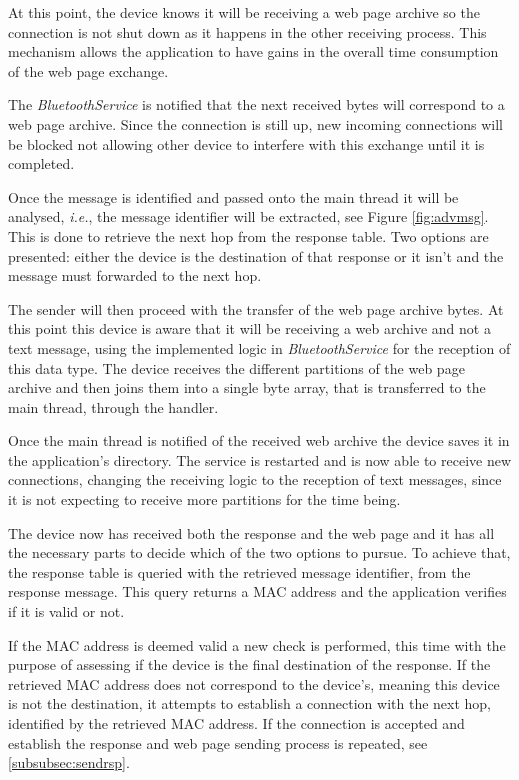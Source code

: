 At this point, the device knows it will be receiving a web page archive so the connection is not shut down as it happens in the other receiving process. This mechanism allows the application to have gains in the overall time consumption of the web page exchange.

The \textit{BluetoothService} is notified that the next received bytes will correspond to a web page archive. Since the connection is still up, new incoming connections will be blocked not allowing other device to interfere with this exchange until it is completed.

Once the message is identified and passed onto the main thread it will be analysed, \textit{i.e.}, the message identifier will be extracted, see Figure \ref{fig:advmsg}. This is done to retrieve the next hop from the response table. Two options are presented: either the device is the destination of that response or it isn't and the message must forwarded to the next hop.

The sender will then proceed with the transfer of the web page archive bytes. At this point this device is aware that it will be receiving a web archive and not a text message, using the implemented logic in \textit{BluetoothService} for the reception of this data type. The device receives the different partitions of the web page archive and then joins them into a single byte array, that is transferred to the main thread, through the handler. 

Once the main thread is notified of the received web archive the device saves it in the application's directory. The service is restarted and is now able to receive new connections, changing the receiving logic to the reception of text messages, since it is not expecting to receive more partitions for the time being.

The device now has received both the response and the web page and it has all the necessary parts to decide which of the two options to pursue. To achieve that, the response table is queried with the retrieved message identifier, from the response message. This query returns a \gls{MAC} address and the application verifies if it is valid or not.

If the \gls{MAC} address is deemed valid a new check is performed, this time with the purpose of assessing if the device is the final destination of the response. If the retrieved \gls{MAC} address does not correspond to the device's, meaning this device is not the destination, it attempts to establish a connection with the next hop, identified by the retrieved \gls{MAC} address. If the connection is accepted and establish the response and web page sending process is repeated, see \ref{subsubsec:sendrsp}.

